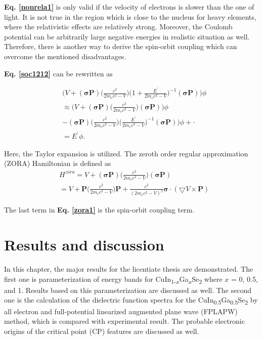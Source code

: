 \documentclass[a4paper, 12pt, titlepage,oneside,drop]{kthesis}
\begin{document}
\textbf{Eq. \ref{nonrela1}} is only valid if the velocity of electrons is slower than the one of light. It is not true in the region which is close to the nucleus for heavy elements, where the relativistic effects
are relatively strong. Moreover, the Coulomb potential can be arbitrarily large negative energies in realistic situation as well. Therefore, there is another way to derive 
the spin-orbit coupling which can overcome the mentioned disadvantages.

\textbf{Eq. \ref{soc1212}} can be rewritten as

\begin{equation}\begin{split}\label{soc001}
& \Big(V + (\boldsymbol{\sigma} \textbf{P}) \Big(\frac{c^2}{2m_ec^2-V}\Big)\Big(1+\frac{E^{\prime}}{2m_ec^2-V}\Big)^{-1} (\boldsymbol{\sigma} \textbf{P}) \Big)\phi \\
& \approx \Big( V + (\boldsymbol{\sigma} \textbf{P}) \Big(\frac{c^2}{2m_ec^2-V}\Big)(\boldsymbol{\sigma} \textbf{P}) \Big)\phi \\
& - (\boldsymbol{\sigma} \textbf{P}) \Big(\frac{c^2}{2m_ec^2-V}\Big)\Big(\frac{E^{\prime}}{2m_ec^2-V}\Big)^{-1} (\boldsymbol{\sigma} \textbf{P}) \Big)\phi + \cdot \\
& =E^{\prime}\phi.
\end{split}
\end{equation}

Here, the Taylor expansion is utilized. The zeroth order regular approximation (ZORA) Hamiltonian \cite{van1994relativistic, faas1995zora, van1996zero} is defined as
\begin{equation}\begin{split}\label{zora1}
& H^{zora} = V + (\boldsymbol{\sigma} \textbf{P}) \Big(\frac{c^2}{2m_ec^2-V}\Big)(\boldsymbol{\sigma} \textbf{P}) \\
& =  V + \textbf{P} \Big(\frac{c^2}{2m_ec^2-V}\Big)\textbf{P} + \frac{c^2}{(2m_ec^2-V)^2} \boldsymbol{\sigma}\cdot(\bigtriangledown V\times \textbf{P})
 \end{split}
\end{equation}

The last term in \textbf{Eq. \ref{zora1}} is the spin-orbit coupling term.


\chapter{Results and discussion}

In this chapter, the major results for the licentiate thesis are demonstrated. The first one is parameterization of energy bands for CuIn{\textsubscript{1-$x$}}Ga{\textsubscript{$x$}}Se\textsubscript{2}
where $x$ = 0, 0.5, and 1. Results based on this parameterization are discussed as well. The second one is the calculation of the dielectric function spectra for the
CuIn{\textsubscript{0.5}}Ga{\textsubscript{0.5}}Se\textsubscript{2} by all electron and full-potential linearized augmented plane wave (FPLAPW) method, which is compared with experimental result.
The probable electronic origins of the critical point (CP) features are discussed as well.
\end{document}
